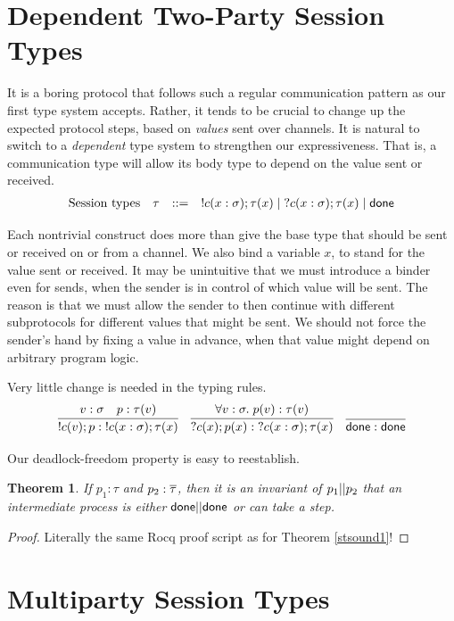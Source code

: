 \documentclass{amsbook}
\newtheorem{theorem}{Theorem}[chapter]
\theoremstyle{definition}
\theoremstyle{remark}
\numberwithin{section}{chapter}
\numberwithin{equation}{chapter}
\begin{document}
\section{Dependent Two-Party Session Types}

It is a boring protocol that follows such a regular communication pattern as our first type system accepts.
Rather, it tends to be crucial to change up the expected protocol steps, based on \emph{values} sent over channels.
It is natural to switch to a \emph{dependent} type system to strengthen our expressiveness.
That is, a communication type will allow its body type to depend on the value sent or received.
$$\begin{array}{rrcl}
  \textrm{Session types} & \tau &::=& !c(x : \sigma); \tau(x) \mid \; ?c(x : \sigma); \tau(x) \mid \mathsf{done}
\end{array}$$

Each nontrivial construct does more than give the base type that should be sent or received on or from a channel.
We also bind a variable $x$, to stand for the value sent or received.
It may be unintuitive that we must introduce a binder even for sends, when the sender is in control of which value will be sent.
The reason is that we must allow the sender to then continue with different subprotocols for different values that might be sent.
We should not force the sender's hand by fixing a value in advance, when that value might depend on arbitrary program logic.

Very little change is needed in the typing rules.
$$\infer{\send{c}{v}{p} : \; \send{c}{x : \sigma}{\tau(x)}}{
  v : \sigma
  & p : \tau(v)
}
\quad \infer{\recv{c}{x}{p(x)} : \; \recv{c}{x : \sigma}{\tau(x)}}{
  \forall v : \sigma. \; p(v) : \tau(v)
}
\quad \infer{\done : \done}{}$$

Our deadlock-freedom property is easy to reestablish.

\begin{theorem}
  If $p_1 : \tau$ and $p_2 : \overline{\tau}$, then it is an invariant of $p_1 || p_2$ that an intermediate process is either $\mathsf{done} || \mathsf{done}$ or can take a step.
\end{theorem}
\begin{proof}
  Literally the same Rocq proof script as for Theorem \ref{stsound1}!
\end{proof}

\section{Multiparty Session Types}
\end{document}
